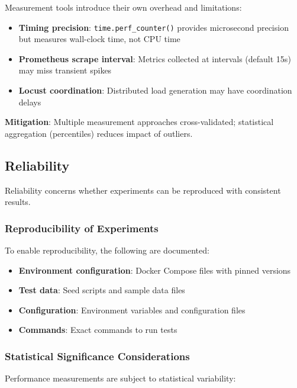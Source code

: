 Measurement tools introduce their own overhead and limitations:

\begin{itemize}
    \item \textbf{Timing precision}: \texttt{time.perf\_counter()} provides microsecond precision but measures wall-clock time, not CPU time
    \item \textbf{Prometheus scrape interval}: Metrics collected at intervals (default 15s) may miss transient spikes
    \item \textbf{Locust coordination}: Distributed load generation may have coordination delays
\end{itemize}

\textbf{Mitigation}: Multiple measurement approaches cross-validated; statistical aggregation (percentiles) reduces impact of outliers.

\subsection{Reliability}

Reliability concerns whether experiments can be reproduced with consistent results.

\subsubsection{Reproducibility of Experiments}

To enable reproducibility, the following are documented:

\begin{itemize}
    \item \textbf{Environment configuration}: Docker Compose files with pinned versions
    \item \textbf{Test data}: Seed scripts and sample data files
    \item \textbf{Configuration}: Environment variables and configuration files
    \item \textbf{Commands}: Exact commands to run tests
\end{itemize}

\subsubsection{Statistical Significance Considerations}

Performance measurements are subject to statistical variability:

